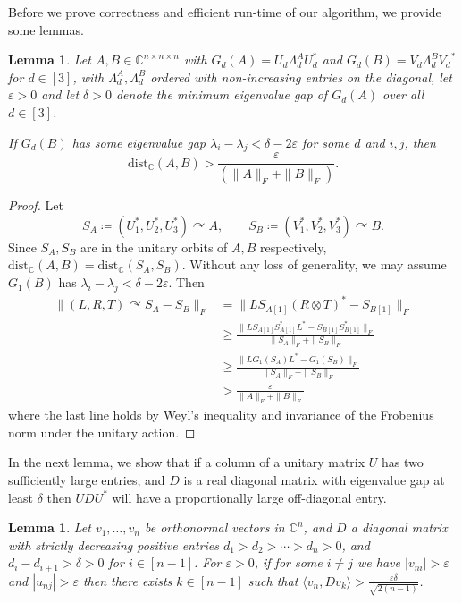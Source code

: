 \documentclass[11pt]{article}
\numberwithin{equation}{section}
\newtheorem{lemma}[theorem]{Lemma}
\theoremstyle{remark}
\newcommand{\C}{\mathbb{C}}
\newcommand{\dist}{\mathrm{dist}}
\newcommand{\angles}[1]{\langle#1\rangle}
\begin{document}
Before we prove correctness and efficient run-time of our algorithm, we provide some lemmas.

\begin{lemma}\label{lem:traceBound}
Let $A,B\in \C^{n\times n\times n}$ with $G_d(A)=U_d\Lambda^A_d U_d^*$ and $G_d(B)=V_d\Lambda^B_d {V_d}^*$ for $d\in [3]$, 
with $\Lambda_d^A,\Lambda_d^B$ ordered with non-increasing entries on the diagonal, let $\varepsilon>0$
and let $\delta>0$ denote the 
minimum eigenvalue gap of $G_d(A)$ over all $d\in [3]$.

If $G_d(B)$ has some eigenvalue gap $\lambda_i-\lambda_j < \delta-2\varepsilon$ for some $d$ and $i,j$, then
\[\dist_\C(A,B)> \frac{\varepsilon}{(\|A\|_F+\|B\|_F)}.\]
\end{lemma}

\begin{proof}
Let
\[
S_A\coloneqq \left(U_1^*, U_2^*, U_3^*\right) \curvearrowright A,\qquad
S_B\coloneqq\left( {V_1^*}, {V_2^*},{V_3^*}\right) \curvearrowright B.
\]
Since $S_A,S_B$ are in the unitary orbits of $A,B$ respectively, 
${\dist_\C(A,B)=\dist_\C(S_A,S_B)}$.
Without any loss of generality, we may assume $G_1(B)$ has $\lambda_i-\lambda_j<\delta-2\varepsilon$. 
Then
\begin{align*}
    \|(L,R,T)\curvearrowright S_A- S_B\|_F &=\|LS_{A[1]}(R\otimes T)^*-S_{B[1]}\|_F\\
    &\geq \frac{\|LS_{A[1]}S_{A[1]}^* L^*-S_{B[1]}S_{B[1]}^* \|_F}{\|S_A\|_F+\|S_B\|_F} \\
    &\geq \frac{\|LG_1(S_A) L^* -G_1(S_B)\|_F}{\|S_A\|_F+\|S_B\|_F} \\
    &> \frac{\varepsilon }{\|A\|_F+\|B\|_F}
\end{align*}
where the last line holds by Weyl's inequality and invariance of the Frobenius norm under the unitary action.
\end{proof}

In the next lemma, we show that if a column of a unitary matrix $U$ has two sufficiently large entries,
and $D$ is a real diagonal matrix with eigenvalue gap at least $\delta$ then $UDU^*$ will have a proportionally large off-diagonal entry.   

\begin{lemma}\label{lem:orthonormalvectors}
Let $v_1,\dots,v_n$ be 
orthonormal vectors in $\C^n$, and $D$ a diagonal matrix with strictly decreasing positive entries $d_1>d_2>\cdots > d_n>0$,
and $d_i-d_{i+1}>\delta>0$ for $i\in [n-1]$.
For $\varepsilon>0$, if for some $i\neq j$ we have $|v_{ni}|>\varepsilon$ and  $|u_{nj}|>\varepsilon$ then there exists
$k\in [n-1]$ such that $\angles{v_n, Dv_k} > \frac{\varepsilon \delta}{\sqrt{2(n-1)}}$.
\end{lemma}
\end{document}
